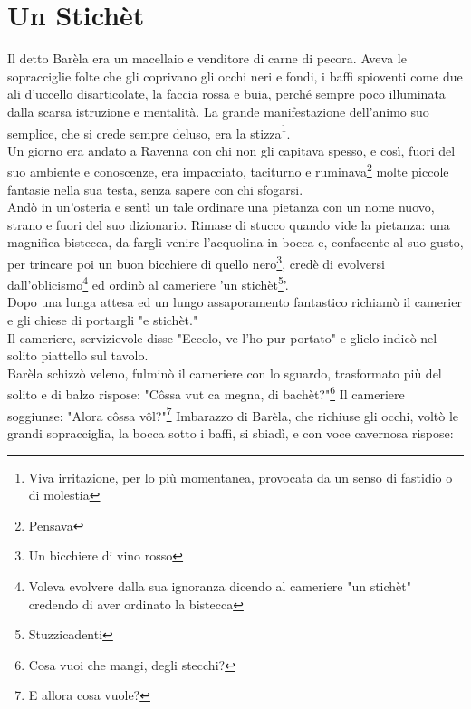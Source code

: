 \documentclass[10pt]{memoir} %
\begin{document}

\chapter{Un Stichèt}
Il detto Barèla era un macellaio e venditore di carne di pecora. Aveva le sopracciglie folte che gli coprivano gli occhi neri e fondi, i baffi spioventi come due ali d'uccello disarticolate, la faccia rossa e buia, perché sempre poco illuminata dalla scarsa istruzione e mentalità. La grande manifestazione dell'animo suo semplice, che si crede sempre deluso, era la stizza\footnote{Viva irritazione, per lo più momentanea, provocata da un senso di fastidio o di molestia}. \\
Un giorno era andato a Ravenna con chi non gli capitava spesso, e così, fuori del suo ambiente e conoscenze, era impacciato, taciturno e ruminava\footnote{Pensava} molte piccole fantasie nella sua testa, senza sapere con chi sfogarsi.\\
Andò in un'osteria e sentì un tale ordinare una pietanza con un nome nuovo, strano e fuori del suo dizionario. Rimase di stucco quando vide la pietanza: una magnifica bistecca, da fargli venire l'acquolina in bocca e, confacente al suo gusto, per trincare poi un buon bicchiere di quello nero\footnote{Un bicchiere di vino rosso}, credè di evolversi dall'oblicismo\footnote{Voleva evolvere dalla sua ignoranza dicendo al cameriere "un stichèt" credendo di aver ordinato la bistecca} ed ordinò al cameriere 'un stichèt\footnote{Stuzzicadenti}'. \\
Dopo una lunga attesa ed un lungo assaporamento fantastico richiamò il camerier e gli chiese di portargli "e stichèt."\\
Il cameriere, servizievole disse "Eccolo, ve l'ho pur portato" e glielo indicò nel solito piattello sul tavolo.\\
Barèla schizzò veleno, fulminò il cameriere con lo sguardo, trasformato più del solito e di balzo rispose: "Côssa vut ca megna, di bachèt?"\footnote{Cosa vuoi che mangi, degli stecchi?}
Il cameriere soggiunse: "Alora côssa vôl?"\footnote{E allora cosa vuole?}
Imbarazzo di Barèla, che richiuse gli occhi, voltò le grandi sopracciglia, la bocca sotto i baffi, si sbiadì, e con voce cavernosa rispose: \\
\end{document}
